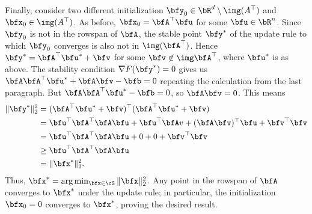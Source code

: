\begin{homework}[e]
\begin{prf}
\begin{enumerate}[(a)]
        \bigskip

        Finally, consider two different initialization $\bfy_0 \in \bR^d \setminus \img(A^\top)$ and $\bfx_0 \in \img(A^\top)$. As before, $\bfx_0 = \bfA^\top \bfu$ for some $\bfu \in \bR^n$. Since $\bfy_0$ is not in the rowspan of $\bfA$, the stable point $\bfy^*$ of the update rule to which $\bfy_0$ converges is also not in $\img(\bfA^\top)$. Hence $\bfy^* = \bfA^\top \bfu^* + \bfv$ for some $\bfv \not\in \img\bfA^\top$, where $\bfu^*$ is as above. The stability condition $\nabla F(\bfy^*) = 0$ gives us $\bfA\bfA^\top \bfu^* + \bfA\bfv - \bfb = 0$ repeating the calculation from the last paragraph. But $\bfA\bfA^\top \bfu^* - \bfb = 0$, so $\bfA\bfv = 0$. This means
        \begin{align*}
          \|\bfy^*\|^2_2 
            &= (\bfA^\top \bfu^* + \bfv)^\top (\bfA^\top \bfu^* + \bfv) \\
            &= \bfu^\top \bfA^\top \bfA \bfu + \bfu^\top \bfA v + (\bfA\bfv)^\top \bfu + \bfv^\top \bfv \\
            &= \bfu^\top \bfA^\top \bfA \bfu + 0 + 0 + \bfv^\top \bfv \\
            &\geq \bfu^\top \bfA^\top \bfA \bfu \\
            &= \|\bfx^*\|^2_2.
        \end{align*}
        Thus, $\bfx^* = \arg\min_{\bfx\in \cS} \|\bfx\|^2_2$. Any point in the rowspan of $\bfA$ converges to $\bfx^*$ under the update rule; in particular, the initialization $\bfx_0 = 0$ converges to $\bfx^*$, proving the desired result.
    \end{enumerate}
  \end{prf}


\end{homework}
